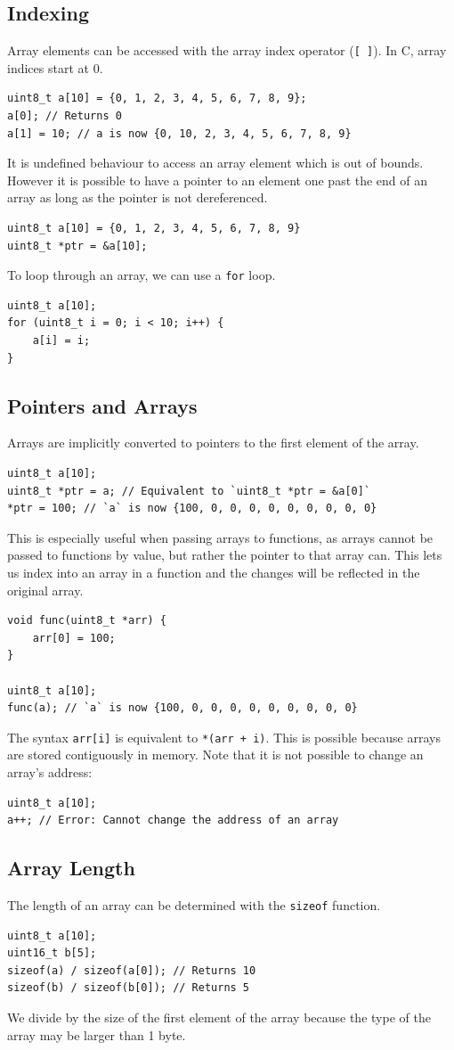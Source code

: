 \documentclass{report}
\begin{document}
\subsection{Indexing}
Array elements can be accessed with the array index operator (\texttt{[ ]}).
In C, array indices start at 0.
\begin{verbatim}
uint8_t a[10] = {0, 1, 2, 3, 4, 5, 6, 7, 8, 9};
a[0]; // Returns 0
a[1] = 10; // a is now {0, 10, 2, 3, 4, 5, 6, 7, 8, 9}
\end{verbatim}
It is undefined behaviour to access an array element which is out of bounds.
However it is possible to have a pointer to an element one past the end of an array
as long as the pointer is not dereferenced.
\begin{verbatim}
uint8_t a[10] = {0, 1, 2, 3, 4, 5, 6, 7, 8, 9}
uint8_t *ptr = &a[10];
\end{verbatim}
To loop through an array, we can use a \texttt{for} loop.
\begin{verbatim}
uint8_t a[10];
for (uint8_t i = 0; i < 10; i++) {
    a[i] = i;
}
\end{verbatim}
\subsection{Pointers and Arrays}
Arrays are implicitly converted to pointers to the first element of the array.
\begin{verbatim}
uint8_t a[10];
uint8_t *ptr = a; // Equivalent to `uint8_t *ptr = &a[0]`
*ptr = 100; // `a` is now {100, 0, 0, 0, 0, 0, 0, 0, 0, 0}
\end{verbatim}
This is especially useful when passing arrays to functions, as
arrays cannot be passed to functions by value, but rather the
pointer to that array can.
This lets us index into an array in a function
and the changes will be reflected in the original array.
\begin{verbatim}
void func(uint8_t *arr) {
    arr[0] = 100;
}

uint8_t a[10];
func(a); // `a` is now {100, 0, 0, 0, 0, 0, 0, 0, 0, 0}
\end{verbatim}
The syntax \texttt{arr[i]} is equivalent to \texttt{*(arr + i)}.
This is possible because arrays are stored contiguously in memory.
Note that it is not possible to change an array's address:
\begin{verbatim}
uint8_t a[10];
a++; // Error: Cannot change the address of an array
\end{verbatim}
\subsection{Array Length}
The length of an array can be determined with the \texttt{sizeof} function.
\begin{verbatim}
uint8_t a[10];
uint16_t b[5];
sizeof(a) / sizeof(a[0]); // Returns 10
sizeof(b) / sizeof(b[0]); // Returns 5
\end{verbatim}
We divide by the size of the first element of the array because
the type of the array may be larger than 1 byte.
\end{document}
